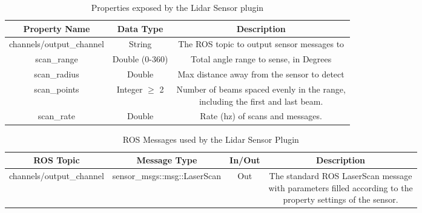 \begin{itemize}
\begin{table}[h!]
	\centering
	\caption{Properties exposed by the Lidar Sensor plugin}
	\label{tab:lidar_props}
	\begin{tabular}{c|c|c}
	Property Name & Data Type & Description\\ \hline \hline
	channels/output\_channel & String & The ROS topic to output sensor messages to\\ \hline
	scan\_range & Double (0-360) & Total angle range to sense, in Degrees\\ \hline
	scan\_radius & Double & Max distance away from the sensor to detect\\ \hline
	scan\_points & Integer $\geq$ 2 & \makecell{Number of beams spaced evenly in the range,\\ including the first and last beam.}\\ \hline
	scan\_rate & Double & Rate (hz) of scans and messages.
	\end{tabular}
\end{table}
\begin{table}[h!]
	\centering
	\caption{ROS Messages used by the Lidar Sensor Plugin}
	\label{tab:lidar_msgs}
	\begin{tabular}{c|c|c|c}
	ROS Topic & Message Type & In/Out & Description\\ \hline \hline
	channels/output\_channel & sensor\_msgs::msg::LaserScan & Out & \makecell{The standard ROS LaserScan message \\with parameters filled according to the \\property settings of the sensor.}
	\end{tabular}
\end{table}


\end{itemize}

